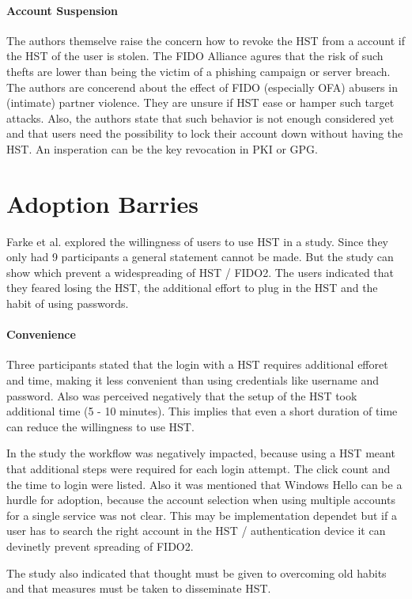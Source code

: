 \documentclass[runningheads]{llncs}
\begin{document}
\paragraph{Account Suspension}
The authors themselve raise the concern how to revoke the HST from a account if the HST of the user is stolen. The FIDO Alliance agures that the risk of such thefts are lower than being the victim of a phishing campaign or server breach. The authors are concerend about the effect of FIDO (especially OFA) abusers in (intimate) partner violence. They are unsure if HST ease or hamper such target attacks. Also, the authors state that such behavior is not enough considered yet and that users need the possibility to lock their account down without having the HST. An insperation can be the key revocation in PKI or GPG. 

\section{Adoption Barries}
Farke et al. explored the willingness of users to use HST in a study. Since they only had 9 participants a general statement cannot be made. But the study can show which prevent a widespreading of HST / FIDO2. The users indicated that they feared losing the HST, the additional effort to plug in the HST and the habit of using passwords.

\paragraph{Convenience}
Three participants stated that the login with a HST requires additional efforet and time, making it less convenient than using credentials like username and password. Also was perceived negatively that the setup of the HST took additional time (5 - 10 minutes). This implies that even a short duration of time can reduce the willingness to use HST.

In the study the workflow was negatively impacted, because using a HST meant that additional steps were required for each login attempt. The click count and the time to login were listed. Also it was mentioned that Windows Hello can be a hurdle for adoption, because the account selection when using multiple accounts for a single service was not clear. This may be implementation dependet but if a user has to search the right account in the HST / authentication device it can devinetly prevent spreading of FIDO2. 

The study also indicated that thought must be given to overcoming old habits and that measures must be taken to disseminate HST.
\end{document}
